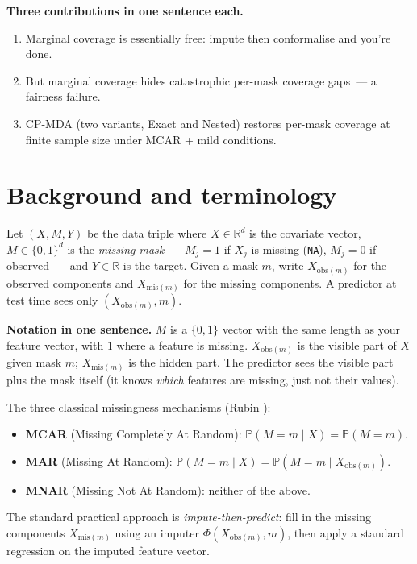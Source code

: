 \documentclass[letterpaper,11pt,leqno]{article}
\begin{document}
\begin{explain}
\textbf{Three contributions in one sentence each.}
\begin{enumerate}
\item Marginal coverage is essentially free: impute then conformalise and you're done.
\item But marginal coverage hides catastrophic per-mask coverage gaps~--- a fairness failure.
\item CP-MDA (two variants, Exact and Nested) restores per-mask coverage at finite sample size under MCAR + mild conditions.
\end{enumerate}
\end{explain}

\section{Background and terminology}\label{s:background}

Let $(X, M, Y)$ be the data triple where $X \in \mathbb{R}^d$ is the covariate vector, $M \in \{0, 1\}^d$ is the \emph{missing mask}~--- $M_j = 1$ if $X_j$ is missing (\texttt{NA}), $M_j = 0$ if observed~--- and $Y \in \mathbb{R}$ is the target. Given a mask $m$, write $X_{\text{obs}(m)}$ for the observed components and $X_{\text{mis}(m)}$ for the missing components. A predictor at test time sees only $(X_{\text{obs}(m)}, m)$.

\begin{definitionexplain}
\textbf{Notation in one sentence.} $M$ is a $\{0,1\}$ vector with the same length as your feature vector, with $1$ where a feature is missing. $X_{\text{obs}(m)}$ is the visible part of $X$ given mask $m$; $X_{\text{mis}(m)}$ is the hidden part. The predictor sees the visible part plus the mask itself (it knows \emph{which} features are missing, just not their values).
\end{definitionexplain}

The three classical missingness mechanisms (Rubin \cite{rubin1976missing}):
\begin{itemize}
\item \textbf{MCAR} (Missing Completely At Random): $\mathbb{P}(M = m \mid X) = \mathbb{P}(M = m)$.
\item \textbf{MAR} (Missing At Random): $\mathbb{P}(M = m \mid X) = \mathbb{P}(M = m \mid X_{\text{obs}(m)})$.
\item \textbf{MNAR} (Missing Not At Random): neither of the above.
\end{itemize}
The standard practical approach is \emph{impute-then-predict}: fill in the missing components $X_{\text{mis}(m)}$ using an imputer $\Phi(X_{\text{obs}(m)}, m)$, then apply a standard regression on the imputed feature vector.
\end{document}
